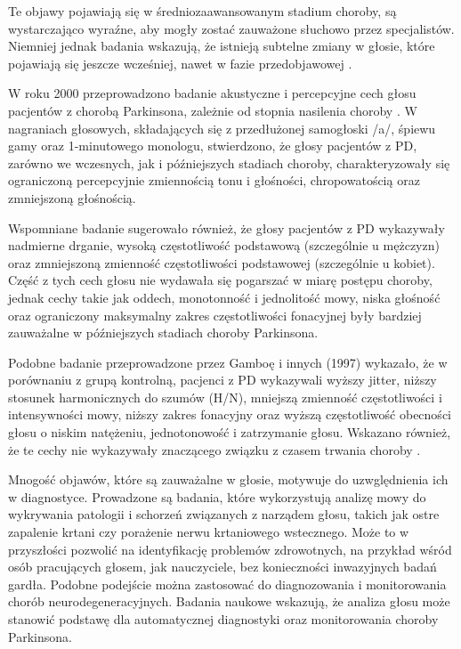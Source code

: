 Te objawy pojawiają się w średniozaawansowanym stadium choroby, są wystarczająco wyraźne, aby mogły zostać zauważone słuchowo przez specjalistów.
Niemniej jednak badania wskazują, że istnieją subtelne zmiany w głosie, które pojawiają się jeszcze wcześniej, nawet w fazie przedobjawowej \cite{2023_PD_voice}.

W roku 2000 przeprowadzono badanie akustyczne i percepcyjne cech głosu pacjentów z chorobą Parkinsona, zależnie od stopnia nasilenia choroby \cite{https://doi.org/10.1080/136828200410654}.
W nagraniach głosowych, składających się z przedłużonej samogłoski /a/, śpiewu gamy oraz 1-minutowego monologu, stwierdzono, że głosy pacjentów z PD,
zarówno we wczesnych, jak i późniejszych stadiach choroby, charakteryzowały się ograniczoną percepcyjnie zmiennością tonu i głośności, chropowatością
oraz zmniejszoną głośnością.

Wspomniane badanie sugerowało również, że głosy pacjentów z PD wykazywały nadmierne drganie, wysoką częstotliwość podstawową (szczególnie u mężczyzn) oraz zmniejszoną zmienność częstotliwości podstawowej (szczególnie u kobiet).
Część z tych cech głosu nie wydawała się pogarszać w miarę postępu choroby, jednak cechy takie jak oddech, monotonność i jednolitość mowy, niska głośność oraz ograniczony maksymalny zakres częstotliwości fonacyjnej były bardziej zauważalne w późniejszych stadiach choroby Parkinsona.

Podobne badanie przeprowadzone przez Gamboę i innych (1997) wykazało, że w porównaniu z grupą kontrolną, pacjenci z PD wykazywali wyższy jitter, niższy stosunek harmonicznych do szumów (H/N), mniejszą zmienność częstotliwości i intensywności mowy, niższy zakres fonacyjny oraz wyższą częstotliwość obecności głosu o niskim natężeniu, jednotonowość i zatrzymanie głosu.
Wskazano również, że te cechy nie wykazywały znaczącego związku z czasem trwania choroby \cite{GAMBOA1997314}.

Mnogość objawów, które są zauważalne w głosie, motywuje do uzwględnienia ich w diagnostyce.
Prowadzone są badania, które wykorzystują analizę mowy do wykrywania patologii i schorzeń związanych z narządem głosu, takich jak ostre zapalenie krtani czy porażenie nerwu krtaniowego wstecznego.
Może to w przyszłości pozwolić na identyfikację problemów zdrowotnych, na przykład wśród osób pracujących głosem, jak nauczyciele, bez konieczności inwazyjnych badań gardła.
Podobne podejście można zastosować do diagnozowania i monitorowania chorób neurodegeneracyjnych.
Badania naukowe wskazują, że analiza głosu może stanowić podstawę dla automatycznej diagnostyki oraz monitorowania choroby Parkinsona.


